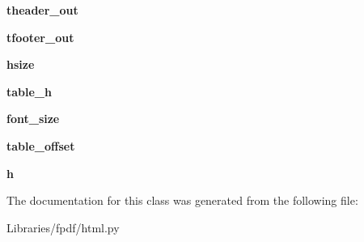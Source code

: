 \begin{DoxyCompactItemize}
\item 
{\bfseries theader\+\_\+out}\hypertarget{class_libraries_1_1fpdf_1_1html_1_1_h_t_m_l2_f_p_d_f_afd1ebf80279110be448f2f341975065c}{}\label{class_libraries_1_1fpdf_1_1html_1_1_h_t_m_l2_f_p_d_f_afd1ebf80279110be448f2f341975065c}

\item 
{\bfseries tfooter\+\_\+out}\hypertarget{class_libraries_1_1fpdf_1_1html_1_1_h_t_m_l2_f_p_d_f_aaa660163f162cfec6e6ea78d2a772804}{}\label{class_libraries_1_1fpdf_1_1html_1_1_h_t_m_l2_f_p_d_f_aaa660163f162cfec6e6ea78d2a772804}

\item 
{\bfseries hsize}\hypertarget{class_libraries_1_1fpdf_1_1html_1_1_h_t_m_l2_f_p_d_f_a25526c29551ec48f5d9321e4dd305c5f}{}\label{class_libraries_1_1fpdf_1_1html_1_1_h_t_m_l2_f_p_d_f_a25526c29551ec48f5d9321e4dd305c5f}

\item 
{\bfseries table\+\_\+h}\hypertarget{class_libraries_1_1fpdf_1_1html_1_1_h_t_m_l2_f_p_d_f_ac0bb798d9236daf9dc4e4d7a3f0ac59f}{}\label{class_libraries_1_1fpdf_1_1html_1_1_h_t_m_l2_f_p_d_f_ac0bb798d9236daf9dc4e4d7a3f0ac59f}

\item 
{\bfseries font\+\_\+size}\hypertarget{class_libraries_1_1fpdf_1_1html_1_1_h_t_m_l2_f_p_d_f_a240a47a1ef4217d9bf0e572619a6d26f}{}\label{class_libraries_1_1fpdf_1_1html_1_1_h_t_m_l2_f_p_d_f_a240a47a1ef4217d9bf0e572619a6d26f}

\item 
{\bfseries table\+\_\+offset}\hypertarget{class_libraries_1_1fpdf_1_1html_1_1_h_t_m_l2_f_p_d_f_a094bab94132c3ff30d102b641266962b}{}\label{class_libraries_1_1fpdf_1_1html_1_1_h_t_m_l2_f_p_d_f_a094bab94132c3ff30d102b641266962b}

\item 
{\bfseries h}\hypertarget{class_libraries_1_1fpdf_1_1html_1_1_h_t_m_l2_f_p_d_f_ac20b4b11de96eb996948cdfec8b232d3}{}\label{class_libraries_1_1fpdf_1_1html_1_1_h_t_m_l2_f_p_d_f_ac20b4b11de96eb996948cdfec8b232d3}

\end{DoxyCompactItemize}


The documentation for this class was generated from the following file\+:\begin{DoxyCompactItemize}
\item 
Libraries/fpdf/html.\+py\end{DoxyCompactItemize}
